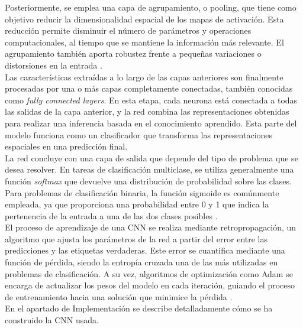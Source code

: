 \documentclass[12pt]{article} %
\begin{document}
Posteriormente, se emplea una capa de agrupamiento, o pooling, que tiene como objetivo reducir la dimensionalidad espacial de los mapas de activación. Esta reducción permite disminuir el número de parámetros y operaciones computacionales, al tiempo que se mantiene la información más relevante. El agrupamiento también aporta robustez frente a pequeñas variaciones o distorsiones en la entrada \cite{sermanet2013overfeat}. \\

Las características extraídas a lo largo de las capas anteriores son finalmente procesadas por una o más capas completamente conectadas, también conocidas como \textit{fully connected layers}. En esta etapa, cada neurona está conectada a todas las salidas de la capa anterior, y la red combina las representaciones obtenidas para realizar una inferencia basada en el conocimiento aprendido. Esta parte del modelo funciona como un clasificador que transforma las representaciones espaciales en una predicción final.\\

La red concluye con una capa de salida que depende del tipo de problema que se desea resolver. En tareas de clasificación multiclase, se utiliza generalmente una función \textit{softmax} que devuelve una distribución de probabilidad sobre las clases. Para problemas de clasificación binaria, la función sigmoide es comúnmente empleada, ya que proporciona una probabilidad entre 0 y 1 que indica la pertenencia de la entrada a una de las dos clases posibles \cite{bishop2006pattern}.\\

El proceso de aprendizaje de una CNN se realiza mediante retropropagación, un algoritmo que ajusta los parámetros de la red a partir del error entre las predicciones y las etiquetas verdaderas. Este error se cuantifica mediante una función de pérdida, siendo la entropía cruzada una de las más utilizadas en problemas de clasificación. A su vez, algoritmos de optimización como Adam se encarga de actualizar los pesos del modelo en cada iteración, guiando el proceso de entrenamiento hacia una solución que minimice la pérdida \cite{kingma2014adam,rumelhart1986learning}. \\

En el apartado de Implementación se describe detalladamente cómo se ha construido la CNN usada.
\end{document}
